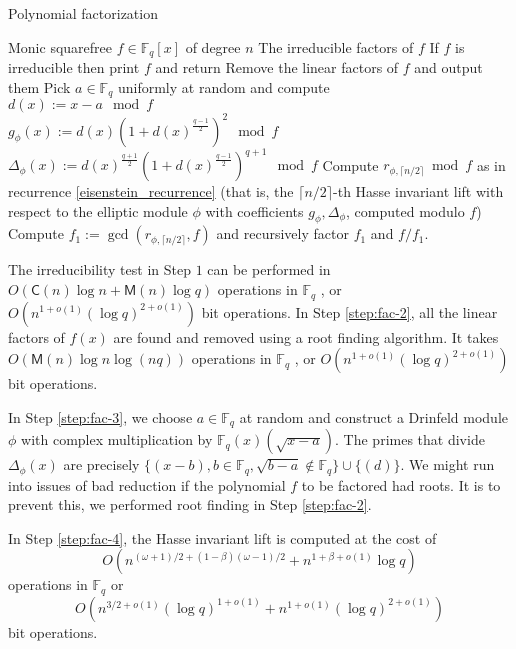 \documentclass[12pt]{article}
\theoremstyle{plain}
\theoremstyle{definition}
\def\F{\ensuremath{\mathbb{F}}}
\def\MM{\ensuremath{\mathsf{M}}}
\def\CC{\ensuremath{\mathsf{C}}}
\newcommand{\D}{\Delta}
\begin{document}
\begin{algorithm}[H]
	\caption{Polynomial factorization}
	\label{factoring_algorithm}
	\begin{algorithmic}[1]
		\REQUIRE Monic squarefree $f \in \F_q[x]$ of degree $n$
		\ENSURE The irreducible factors of $f$
		\STATE If $f$ is irreducible then print $f$ and return
		\STATE\label{step:fac-2}
		Remove the linear factors of $f$ and output them
		\STATE\label{step:fac-3}
		Pick $a \in \F_q$ uniformly at random and compute \\
		$d(x) := x - a \mod f$ \\
		$g_\phi(x) := d(x)(1+d(x)^{\frac{q-1}{2}})^2 \mod f$ \\
		$\Delta_\phi(x) := d(x)^{\frac{q+1}{2}}(1+d(x)^{\frac{q-1}{2}})^{q+1} \mod f$
		\STATE\label{step:fac-4}
		Compute $r_{\phi, \lceil n / 2 \rceil} \bmod f$ as in recurrence 
		\eqref{eisenstein_recurrence} (that is, the $\lceil n / 2 \rceil$-th Hasse invariant lift 
		with respect to the elliptic module $\phi$ with coefficients $g_\phi, \Delta_\phi$, 
		computed modulo $f$)
		\STATE\label{step:fac-split}
		Compute $f_1 := \gcd(r_{\phi, \lceil n / 2 \rceil}, f)$ and recursively factor $f_1$ and 
		$f/f_1$.
	\end{algorithmic}
\end{algorithm}

The irreducibility test in Step $1$ can be performed in $O(\CC(n)\log n + \MM(n)\log q)$ operations 
in $\F_q$ \cite{vzGG}, or $O(n^{1+o(1)} (\log q)^{2+o(1)})$ bit operations. In Step 
\ref{step:fac-2}, all the linear factors of $f(x)$ are found and removed using a root finding 
algorithm. It takes $O(\MM(n)\log n \log(nq))$ operations in $\F_q$ \cite{vzGG}, or $O(n^{1+o(1)} 
(\log q)^{2+o(1)})$ bit operations.

In Step \ref{step:fac-3}, we choose $a \in \F_q$ at random and construct a Drinfeld module $\phi$ 
with complex multiplication by $\F_q(x)(\sqrt{x-a})$. The primes that divide $\D_\phi(x)$ are 
precisely $\{(x-b),  b \in \F_q, \sqrt{b-a} \notin \F_q\} \cup \{(d)\}$. We might run into issues 
of bad reduction if the polynomial $f$ to be factored had roots. It is to prevent this, we 
performed root finding in Step \ref{step:fac-2}.

In Step \ref{step:fac-4}, the Hasse invariant lift is computed at the cost of 
\[O(n^{(\omega + 1) / 2 + (1 - \beta)(\omega - 1) / 2} + n^{1 + \beta + o(1)}\log q)\]
operations in $\F_q$ or 
\[ O(n^{3/2+o(1)} (\log q)^{1+o(1)} + n^{1+o(1)} (\log q)^{2+o(1)}) \]
bit operations. 
 
\end{document}
